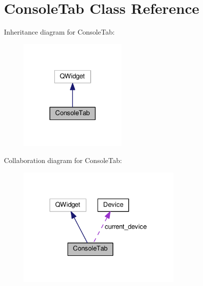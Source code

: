 \hypertarget{classConsoleTab}{}\section{Console\+Tab Class Reference}
\label{classConsoleTab}


Inheritance diagram for Console\+Tab\+:\nopagebreak
\begin{figure}[H]
\begin{center}
\leavevmode
\includegraphics[width=149pt]{classConsoleTab__inherit__graph}
\end{center}
\end{figure}


Collaboration diagram for Console\+Tab\+:\nopagebreak
\begin{figure}[H]
\begin{center}
\leavevmode
\includegraphics[width=228pt]{classConsoleTab__coll__graph}
\end{center}
\end{figure}
